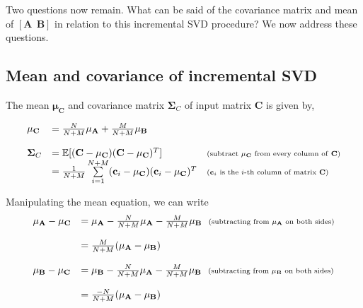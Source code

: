 Two questions now remain.  What can be said of the covariance matrix and mean of $\left[{\mathbf{A}} \ \ \mathbf{B}\right]$ in relation to this incremental SVD procedure?  We now address these questions.


\subsection{Mean and covariance of incremental SVD}
The mean $\mathbf{\mu}_\mathbf{C}$ and covariance matrix $\mathbf{\Sigma}_C$ of input matrix $\mathbf{C}$ is given by,

\begin{equation}
\begin{array}{llll}
\mathbf{\mu}_\mathbf{C} &= \frac{N}{N+M}\mathbf{\mu}_\mathbf{A} + \frac{M}{N+M}\mathbf{\mu}_\mathbf{B}\\\\
\mathbf{\Sigma}_C &= \mathbb{E}[(\mathbf{C}-\mathbf{\mu}_\mathbf{C})(\mathbf{C}-\mu_\mathbf{C})^T] & \textrm{\scriptsize (subtract $\mathbf{\mu}_\mathbf{C}$ from every column of \textbf{C})}\\
&=\frac{1}{N+M}\sum\limits_{i=1}^{N+M} (\mathbf{c}_i-\mathbf{\mu}_\mathbf{C})(\mathbf{c}_i-\mu_\mathbf{C})^T & \textrm{\scriptsize ($\mathbf{c}_i$ is the $i$-th column of matrix $\mathbf{C}$)}\\
\end{array}
\end{equation}

Manipulating the mean equation, we can write
\begin{equation}
\begin{array}{llll}
\mathbf{\mu}_\mathbf{A} -\mathbf{\mu}_\mathbf{C} &= \mathbf{\mu}_\mathbf{A} - \frac{N}{N+M}\mathbf{\mu}_\mathbf{A} - \frac{M}{N+M}\mathbf{\mu}_\mathbf{B} \ \ \scriptsize{\textrm{(subtracting from $\mathbf{\mu}_\mathbf{A}$ on both sides)}}\\\\

&=\frac{M}{N+M}(\mathbf{\mu}_\mathbf{A} - \mathbf{\mu}_\mathbf{B})\\\\

\mathbf{\mu}_\mathbf{B} -\mathbf{\mu}_\mathbf{C} &= \mathbf{\mu}_\mathbf{B} - \frac{N}{N+M}\mathbf{\mu}_\mathbf{A} - \frac{M}{N+M}\mathbf{\mu}_\mathbf{B} \ \ \scriptsize{\textrm{(subtracting from $\mathbf{\mu}_\mathbf{B}$ on both sides)}}\\\\

&=\frac{-N}{N+M}(\mathbf{\mu}_\mathbf{A} - \mathbf{\mu}_\mathbf{B})
\end{array}
\end{equation}



